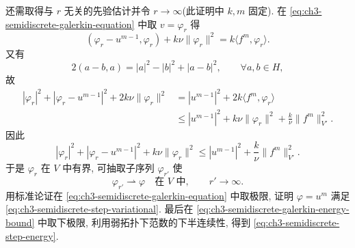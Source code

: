 \begin{Proof}
\hypertarget{chapter-03-page-235}{}
还需取得与 $r$ 无关的先验估计并令 $r\to\infty$(此证明中 $k,m$ 固定). 在 \eqref{eq:ch3-semidiscrete-galerkin-equation} 中取 $v=\varphi_r$ 得
\begin{equation}
(\varphi_r-u^{m-1},\varphi_r)+k\nu\lVert\varphi_r\rVert^2
=k\langle f^m,\varphi_r\rangle.
\label{eq:ch3-semidiscrete-galerkin-energy}
\end{equation}
又有
\begin{equation}
2(a-b,a)=|a|^2-|b|^2+|a-b|^2,
\qquad\forall a,b\in H,
\label{eq:ch3-semidiscrete-polarization}
\end{equation}
故
\begin{equation}
\begin{aligned}
|\varphi_r|^2+|\varphi_r-u^{m-1}|^2+2k\nu\lVert\varphi_r\rVert^2
&=|u^{m-1}|^2+2k\langle f^m,\varphi_r\rangle\\
&\leq|u^{m-1}|^2+k\nu\lVert\varphi_r\rVert^2
+\frac k\nu\lVert f^m\rVert_{V'}^2.
\end{aligned}
\label{eq:ch3-semidiscrete-galerkin-energy-bound}
\end{equation}
因此
\begin{equation}
|\varphi_r|^2+|\varphi_r-u^{m-1}|^2+k\nu\lVert\varphi_r\rVert^2
\leq|u^{m-1}|^2+\frac k\nu\lVert f^m\rVert_{V'}^2.
\label{eq:ch3-semidiscrete-galerkin-uniform-bound}
\end{equation}
于是 $\varphi_r$ 在 $V$ 中有界, 可抽取子序列 $\varphi_{r'}$ 使
\begin{equation}
\varphi_{r'}\rightharpoonup\varphi\quad\text{在 }V\text{ 中},
\qquad r'\to\infty.
\label{eq:ch3-semidiscrete-galerkin-weak-limit}
\end{equation}
用标准论证在 \eqref{eq:ch3-semidiscrete-galerkin-equation} 中取极限, 证明 $\varphi=u^m$ 满足 \eqref{eq:ch3-semidiscrete-step-variational}. 最后在 \eqref{eq:ch3-semidiscrete-galerkin-energy-bound} 中取下极限, 利用弱拓扑下范数的下半连续性, 得到 \eqref{eq:ch3-semidiscrete-step-energy}.
\end{Proof}

